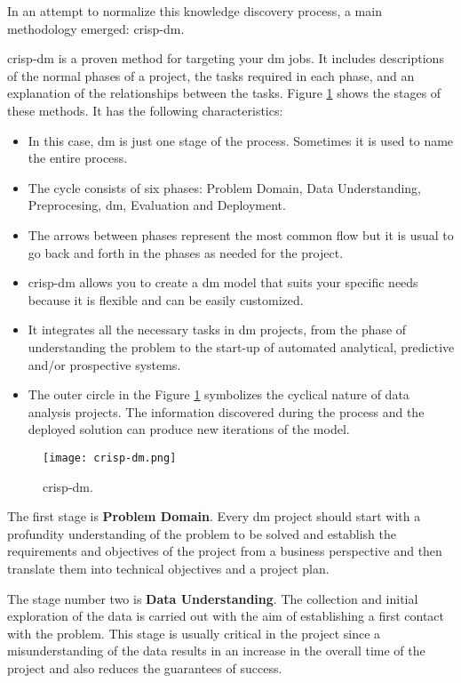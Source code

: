 In an attempt to normalize this knowledge discovery process, a main methodology emerged: \acrfull{crisp-dm}.

\acrshort{crisp-dm} is a proven method for targeting your \acrshort{dm} jobs. It includes descriptions of the normal phases of a project, the tasks required in each phase, and an explanation of the relationships between the tasks. Figure \ref{fig:crisp-dm} shows the stages of these methods. It has the following characteristics:
\begin{itemize}
    \item In this case, \acrlong{dm} is just one stage of the process. Sometimes it is used to name the entire process.
    \item The cycle consists of six phases: Problem Domain, Data Understanding, Preprocesing, \acrlong{dm}, Evaluation and Deployment.
    \item The arrows between phases represent the most common flow but it is usual to go back and forth in the phases as needed for the project.
    \item \acrshort{crisp-dm} allows you to create a \acrshort{dm} model that suits your specific needs because it is flexible and can be easily customized.
    \item It integrates all the necessary tasks in \acrshort{dm} projects, from the phase of understanding the problem to the start-up of automated analytical, predictive and/or prospective systems.
    \item The outer circle in the Figure \ref{fig:crisp-dm} symbolizes the cyclical nature of data analysis projects. The information discovered during the process and the deployed solution can produce new iterations of the model.
\end{itemize}

\begin{figure}[H]
    \centering
    \texttt{[image: crisp-dm.png]}
    \caption{\acrshort{crisp-dm}.}
    \label{fig:crisp-dm}
\end{figure}

The first stage is \textbf{Problem Domain}. Every \acrshort{dm} project should start with a profundity understanding of the problem to be solved and establish the requirements and objectives of the project from a business perspective and then translate them into technical objectives and a project plan.

The stage number two is \textbf{Data Understanding}. The collection and initial exploration of the data is carried out with the aim of establishing a first contact with the problem. This stage is usually critical in the project since a misunderstanding of the data results in an increase in the overall time of the project and also reduces the guarantees of success.

